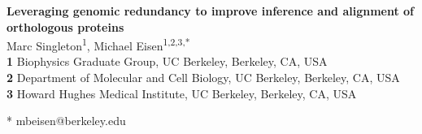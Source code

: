 \documentclass[11pt,letterpaper]{article}
\begin{document}
\graphicspath{{./figures/}}

\begin{flushleft}
{\Large\textbf{Leveraging genomic redundancy to improve inference and alignment of orthologous proteins}}
\newline
\\
Marc Singleton\textsuperscript{1},
Michael Eisen\textsuperscript{1,2,3,*}
\\
\bigskip
\textbf{1} Biophysics Graduate Group, UC Berkeley, Berkeley, CA, USA
\\
\textbf{2} Department of Molecular and Cell Biology, UC Berkeley, Berkeley, CA, USA
\\
\textbf{3} Howard Hughes Medical Institute, UC Berkeley, Berkeley, CA, USA
\\
\bigskip

* mbeisen@berkeley.edu

\end{flushleft}



\printbibliography

\clearpage


\end{document}

